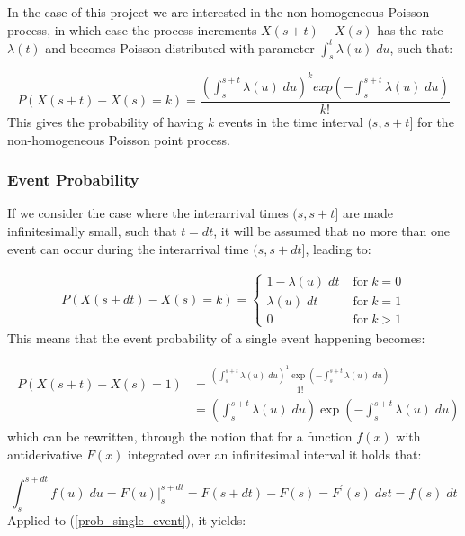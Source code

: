 In the case of this project we are interested in the non-homogeneous Poisson process, in which case the process increments $X(s+t) - X(s)$ has the rate $\lambda(t)$ and becomes Poisson distributed with parameter $\int_s^t \lambda(u)\; du$, such that:

\begin{equation}
    P(X(s+t) - X(s) = k) = \frac{\left(\int_s^{s+t} \lambda(u) \; du \right)^k exp\left(-\int_s^{s+t} \lambda(u) \; du\right)}{k!}
\end{equation}
This gives the probability of having $k$ events in the time interval $(s, s+t]$ for the non-homogeneous Poisson point process.


\subsubsection{Event Probability}
\label{sec:Method:Poisson:EventProbability}
If we consider the case where the interarrival times $(s, s+t]$ are made infinitesimally small, such that $t = dt$, it will be assumed that no more than one event can occur during the interarrival time $(s, s+dt]$, leading to:

\begin{align}
P(X(s+dt) - X(s) = k) = 
\begin{cases}
    1 - \lambda(u) \; dt \; &\text{for} \; k=0 \\
    \lambda(u) \; dt \; &\text{for} \; k=1 \\
    0 \; &\text{for} \; k > 1
\end{cases}
\end{align}
This means that the event probability of a single event happening becomes:

\begin{align}
\begin{split}
    P(X(s+t) - X(s) = 1) 
    &= 
    \frac{\left(\int_s^{s+t} \lambda(u) \; du \right)^1 \exp \left(-\int_s^{s+t} \lambda(u) \; du\right)}{1!} \\
    &= 
    \left(\int_s^{s+t} \lambda(u) \; du \right) \exp \left(-\int_s^{s+t} \lambda(u) \; du\right)
\label{prob_single_event}
\end{split}
\end{align}
which can be rewritten, through the notion that for a function $f(x)$ with antiderivative $F(x)$ integrated over an infinitesimal interval it holds that:

\begin{equation}
    \int_s^{s+dt} f(u) \; du = F(u) \rvert_s^{s+dt} = F(s+dt) - F(s) = F^{\prime}(s) \; dst = f(s) \; dt
\end{equation}
Applied to (\ref{prob_single_event}), it yields:

